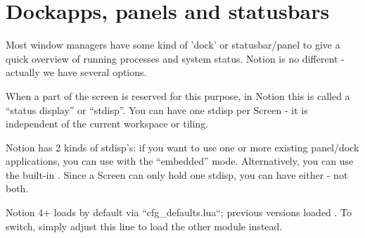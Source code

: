 \section{Dockapps, panels and statusbars}

Most window managers have some kind of 'dock' or statusbar/panel to give a 
quick overview of running processes and system status. Notion is no 
different - actually we have several options.

When a part of the screen is reserved for this purpose, in Notion this is 
called a ``status display'' or ``stdisp''. You can have one stdisp per Screen 
- it is independent of the current workspace or tiling.

Notion has 2 kinds of stdisp's: if you want to use one or more existing 
panel/dock applications, you can use  with the ``embedded'' 
mode.  Alternatively, you can use the built-in . Since a 
Screen can only hold one stdisp, you can have either - not both.

Notion 4+ loads  by default via  ``cfg_defaults.lua``;
previous versions loaded .
To switch, simply adjust this line to load the other module instead.




